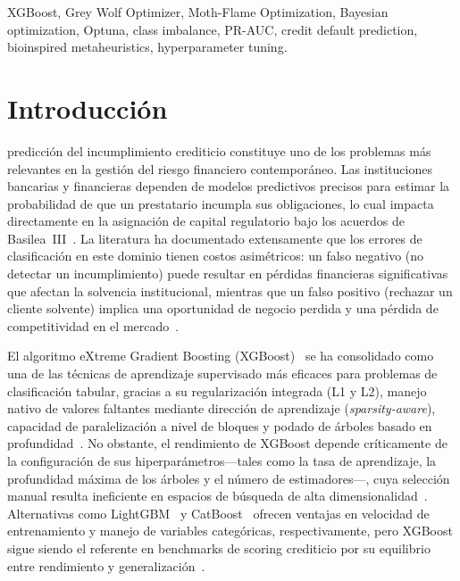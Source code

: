 \documentclass[journal]{IEEEtran}
\begin{document}
\begin{IEEEkeywords}
XGBoost, Grey Wolf Optimizer, Moth-Flame Optimization, Bayesian optimization, Optuna, class imbalance, PR-AUC, credit default prediction, bioinspired metaheuristics, hyperparameter tuning.
\end{IEEEkeywords}

\section{Introducción}
\label{sec:intro}

 predicción del incumplimiento crediticio constituye uno de los problemas más relevantes en la gestión del riesgo financiero contemporáneo. Las instituciones bancarias y financieras dependen de modelos predictivos precisos para estimar la probabilidad de que un prestatario incumpla sus obligaciones, lo cual impacta directamente en la asignación de capital regulatorio bajo los acuerdos de Basilea~III~\cite{basel2017}. La literatura ha documentado extensamente que los errores de clasificación en este dominio tienen costos asimétricos: un falso negativo (no detectar un incumplimiento) puede resultar en pérdidas financieras significativas que afectan la solvencia institucional, mientras que un falso positivo (rechazar un cliente solvente) implica una oportunidad de negocio perdida y una pérdida de competitividad en el mercado~\cite{hand1997, thomas2000}.

El algoritmo eXtreme Gradient Boosting (XGBoost)~\cite{chen2016} se ha consolidado como una de las técnicas de aprendizaje supervisado más eficaces para problemas de clasificación tabular, gracias a su regularización integrada (L1 y L2), manejo nativo de valores faltantes mediante dirección de aprendizaje (\textit{sparsity-aware}), capacidad de paralelización a nivel de bloques y podado de árboles basado en profundidad~\cite{friedman2001}. No obstante, el rendimiento de XGBoost depende críticamente de la configuración de sus hiperparámetros---tales como la tasa de aprendizaje, la profundidad máxima de los árboles y el número de estimadores---, cuya selección manual resulta ineficiente en espacios de búsqueda de alta dimensionalidad~\cite{bergstra2012}. Alternativas como LightGBM~\cite{ke2017} y CatBoost~\cite{prokhorenkova2018} ofrecen ventajas en velocidad de entrenamiento y manejo de variables categóricas, respectivamente, pero XGBoost sigue siendo el referente en benchmarks de scoring crediticio por su equilibrio entre rendimiento y generalización~\cite{lessmann2015}.
\end{document}
